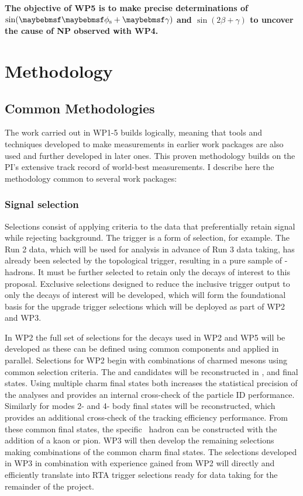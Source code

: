 \documentclass[11pt,a4paper]{article}
\begin{document}
\textbf{The objective of WP5 is to make precise determinations of $\sin(\phis+\gamma)$ and $\sin(2\beta+\gamma)$ to uncover the cause of NP observed with WP4.}

\section{Methodology}

\subsection{Common Methodologies}
The work carried out in WP1-5 builds logically, meaning that tools and techniques developed to make measurements in earlier work packages are also used and further developed in later ones. This proven methodology builds on the PI's extensive track record of world-best measurements. I describe here the methodology common to several work packages:


\subsubsection{Signal selection}
\label{sec:sels}
Selections consist of applying criteria to the data that preferentially retain signal while rejecting background. The trigger is a form of selection, for example. The Run 2 data, which will be used for analysis in advance of Run 3 data taking, has already been selected by the topological trigger, resulting in a pure sample of \Pqb-hadrons. It must be further selected to retain only the decays of interest to this proposal. Exclusive selections designed to reduce the inclusive trigger output to only the decays of interest will be developed, which will form the foundational basis for the upgrade trigger selections which will be deployed as part of WP2 and WP3.  

In WP2 the full set of selections for the  decays used in WP2 and WP5 will be developed as these can be defined using common components and applied in parallel.
Selections for WP2 begin with combinations of charmed mesons using common selection criteria. The \HepProcess{\PDpm} and \HepProcess{\PDspm} candidates will be reconstructed in \HepProcess{\PK\PK\Ppi}, \HepProcess{\PK\Ppi\Ppi} and \HepProcess{\Ppi\Ppi\Ppi} final states. Using multiple charm final states  both increases the statistical precision of the analyses and provides an internal cross-check of the particle ID performance. Similarly for \HepProcess{\PDzero} modes 2- and 4- body final states will be reconstructed, which provides an additional cross-check of the tracking efficiency performance. From these common final states, the specific \Pqb~hadron can be constructed with the addition of a kaon or pion.
WP3 will then develop the remaining selections making combinations of the common charm final states. 
The selections developed in WP3 in combination with experience gained from WP2 will directly and efficiently translate into RTA trigger selections ready for data taking for the remainder of the project.
\end{document}

